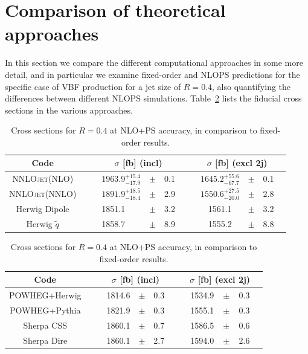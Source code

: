 \documentclass[10pt,prd,fleqn,superscriptaddress,notitlepage,nofootinbib,preprintnumbers,nobalancelastpage]{revtex4-1}
\newcommand{\NNLOJET}{\textsc{NNLOjet}\xspace}
\newcommand{\VBF}{VBF\xspace}
\begin{document}
\section{Comparison of theoretical approaches}
\label{sec:tools}
In this section we compare the different computational approaches in some more detail, and in particular we examine
fixed-order and NLOPS predictions for the specific case of \VBF production for a jet size of $R=0.4$,
also quantifying the differences between different NLOPS simulations. Table~\ref{tab:xs_nlops} lists the 
fiducial cross sections in the various approaches.
\begin{table}[t]
    \centering
    \begin{tabular}{cc|clclccclcl}
         Code &&& \multicolumn{3}{c}{$\sigma$ [fb] (incl)}
         &&& \multicolumn{3}{c}{$\sigma$ [fb] (excl 2j)} \\\hline
         \NNLOJET (NLO) &&&  $1963.9_{-17.9}^{+15.4}$ & $\pm$ & 0.1
         &&&  $1645.2_{-67.7}^{+55.6}$ & $\pm$ & 0.1\\
         \NNLOJET (NNLO) &&& $1891.9_{-18.4}^{+18.5}$ & $\pm$ & 2.9
         &&& $1550.6_{-20.0}^{+27.5}$ & $\pm$ & 2.8\\
         Herwig Dipole &&& 1851.1 & $\pm$ & 3.2
         &&& 1561.1 & $\pm$ & 3.2\\
         Herwig $\tilde{q}$ &&& 1858.7 & $\pm$ & 8.9
         &&& 1555.2 & $\pm$ & 8.8\\
    \end{tabular}\hspace*{5mm}
    \begin{tabular}{cc|clclccclcl}
         Code &&& \multicolumn{3}{c}{$\sigma$ [fb] (incl)}
         &&& \multicolumn{3}{c}{$\sigma$ [fb] (excl 2j)} \\\hline
         POWHEG+Herwig &&& 1814.6 & $\pm$ & 0.3
         &&& 1534.9 & $\pm$ & 0.3\\
         POWHEG+Pythia &&& 1821.9 & $\pm$ & 0.3
         &&& 1555.1 & $\pm$ & 0.3\\
         Sherpa CSS &&& 1860.1 & $\pm$ & 0.7
         &&& 1586.5 & $\pm$ & 0.6\\
         Sherpa Dire &&& 1860.1 & $\pm$ & 2.7
         &&& 1594.0 & $\pm$ & 2.6\\
    \end{tabular}
    \caption{Cross sections for $R=0.4$ at NLO+PS accuracy, in comparison to fixed-order results.}
    \label{tab:xs_nlops}
\end{table}
\end{document}
